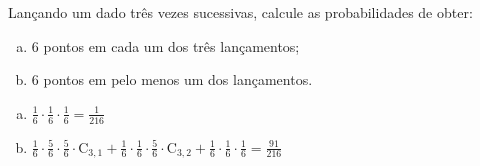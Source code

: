 \begin{ex}
 Lançando um dado três vezes sucessivas, calcule as probabilidades de obter:
    \begin{enumerate}[(a)]
    \item 6 pontos em cada um dos três lançamentos;
    \item 6 pontos em pelo menos um dos lançamentos.
    \end{enumerate}
      \begin{sol}
      \phantom{A} 
         \begin{enumerate} [(a)]
             \item $\frac{1}{6}\cdot\frac{1}{6}\cdot\frac{1}{6}=\frac{1}{216}$
             \item $\frac{1}{6}\cdot\frac{5}{6}\cdot\frac{5}{6}\cdot\mathrm{C}_{3,1}+\frac{1}{6}\cdot\frac{1}{6}\cdot\frac{5}{6}\cdot\mathrm{C}_{3,2}+\frac{1}{6}\cdot\frac{1}{6}\cdot\frac{1}{6}=\frac{91}{216}$
         \end{enumerate}
      \end{sol}
\end{ex}